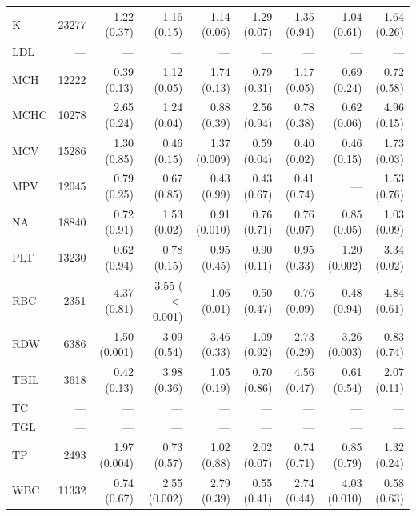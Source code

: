 \begin{table}[ht]
\begin{tabular}{lrrrrrrrr}
K & 23277 & 1.22 (0.37) & 1.16 (0.15) & 1.14 (0.06) & 1.29 (0.07) & 1.35 (0.94) & 1.04 (0.61) & 1.64 (0.26) \\
LDL & --- & --- & --- & --- & --- & --- & --- & --- \\
MCH & 12222 & 0.39 (0.13) & 1.12 (0.05) & 1.74 (0.13) & 0.79 (0.31) & 1.17 (0.05) & 0.69 (0.24) & 0.72 (0.58) \\
MCHC & 10278 & 2.65 (0.24) & 1.24 (0.04) & 0.88 (0.39) & 2.56 (0.94) & 0.78 (0.38) & 0.62 (0.06) & 4.96 (0.15) \\
MCV & 15286 & 1.30 (0.85) & 0.46 (0.15) & 1.37 (0.009) & 0.59 (0.04) & 0.40 (0.02) & 0.46 (0.15) & 1.73 (0.03) \\
MPV & 12045 & 0.79 (0.25) & 0.67 (0.85) & 0.43 (0.99) & 0.43 (0.67) & 0.41 (0.74) & --- & 1.53 (0.76) \\
NA & 18840 & 0.72 (0.91) & 1.53 (0.02) & 0.91 (0.010) & 0.76 (0.71) & 0.76 (0.07) & 0.85 (0.05) & 1.03 (0.09) \\
PLT & 13230 & 0.62 (0.94) & 0.78 (0.15) & 0.95 (0.45) & 0.90 (0.11) & 0.95 (0.33) & 1.20 (0.002) & 3.34 (0.02) \\
RBC & 2351 & 4.37 (0.81) & 3.55 ($<$0.001) & 1.06 (0.01) & 0.50 (0.47) & 0.76 (0.09) & 0.48 (0.94) & 4.84 (0.61) \\
RDW & 6386 & 1.50 (0.001) & 3.09 (0.54) & 3.46 (0.33) & 1.09 (0.92) & 2.73 (0.29) & 3.26 (0.003) & 0.83 (0.74) \\
TBIL & 3618 & 0.42 (0.13) & 3.98 (0.36) & 1.05 (0.19) & 0.70 (0.86) & 4.56 (0.47) & 0.61 (0.54) & 2.07 (0.11) \\
TC & --- & --- & --- & --- & --- & --- & --- & --- \\
TGL & --- & --- & --- & --- & --- & --- & --- & --- \\
TP & 2493 & 1.97 (0.004) & 0.73 (0.57) & 1.02 (0.88) & 2.02 (0.07) & 0.74 (0.71) & 0.85 (0.79) & 1.32 (0.24) \\
WBC & 11332 & 0.74 (0.67) & 2.55 (0.002) & 2.79 (0.39) & 0.55 (0.41) & 2.74 (0.44) & 4.03 (0.010) & 0.58 (0.63) \\
\bottomrule
\end{tabular}
\label{tab:17_incidence_eicu_sepsis}
\end{table}